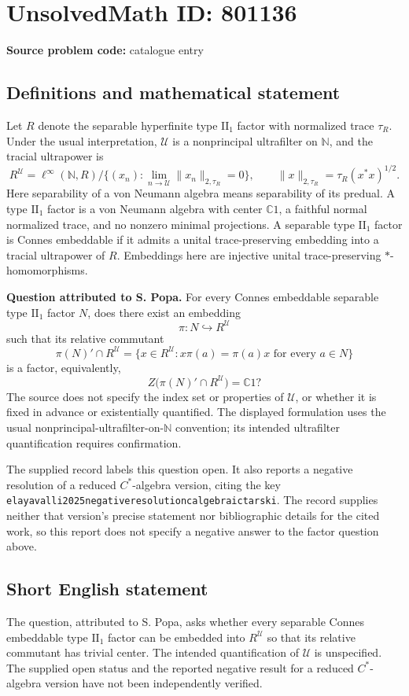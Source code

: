 \documentclass[11pt]{article}
\newcommand{\N}{\mathbb{N}}
\newcommand{\C}{\mathbb{C}}
\begin{document}
\section*{UnsolvedMath ID: 801136}
\textbf{Source problem code:} catalogue entry
\subsection{Definitions and mathematical statement}
Let \(R\) denote the separable hyperfinite type \(\mathrm{II}_1\) factor with normalized trace \(\tau_R\). Under the usual interpretation, \(\mathcal U\) is a nonprincipal ultrafilter on \(\N\), and the tracial ultrapower is
\[
R^{\mathcal U}=\ell^\infty(\N,R)\big/\{(x_n):\lim_{n\to\mathcal U}\|x_n\|_{2,\tau_R}=0\},\qquad
\|x\|_{2,\tau_R}=\tau_R(x^*x)^{1/2}.
\]
Here separability of a von Neumann algebra means separability of its predual. A type \(\mathrm{II}_1\) factor is a von Neumann algebra with center \(\C1\), a faithful normal normalized trace, and no nonzero minimal projections. A separable type \(\mathrm{II}_1\) factor is Connes embeddable if it admits a unital trace-preserving embedding into a tracial ultrapower of \(R\). Embeddings here are injective unital trace-preserving \(*\)-homomorphisms.

\textbf{Question attributed to S. Popa.} For every Connes embeddable separable type \(\mathrm{II}_1\) factor \(N\), does there exist an embedding
\[
\pi:N\hookrightarrow R^{\mathcal U}
\]
such that its relative commutant
\[
\pi(N)'\cap R^{\mathcal U}
=\{x\in R^{\mathcal U}:x\pi(a)=\pi(a)x\text{ for every }a\in N\}
\]
is a factor, equivalently,
\[
Z\bigl(\pi(N)'\cap R^{\mathcal U}\bigr)=\C1?
\]
The source does not specify the index set or properties of \(\mathcal U\), or whether it is fixed in advance or existentially quantified. The displayed formulation uses the usual nonprincipal-ultrafilter-on-\(\N\) convention; its intended ultrafilter quantification requires confirmation.

The supplied record labels this question open. It also reports a negative resolution of a reduced \(C^*\)-algebra version, citing the key \texttt{elayavalli2025negativeresolutioncalgebraictarski}. The record supplies neither that version's precise statement nor bibliographic details for the cited work, so this report does not specify a negative answer to the factor question above.
\subsection{Short English statement}
The question, attributed to S. Popa, asks whether every separable Connes embeddable type \(\mathrm{II}_1\) factor can be embedded into \(R^{\mathcal U}\) so that its relative commutant has trivial center. The intended quantification of \(\mathcal U\) is unspecified. The supplied open status and the reported negative result for a reduced \(C^*\)-algebra version have not been independently verified.
\end{document}
